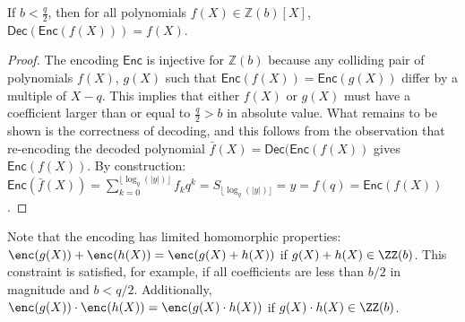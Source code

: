 \begin{lemma}
If $b < \frac{q}{2}$, then for all polynomials $f(X) \in \mathbb{Z}(b)[X]$, $\mathsf{Dec}(\mathsf{Enc}(f(X))) = f(X)$.
\end{lemma}

\begin{proof}
The encoding $\mathsf{Enc}$ is injective for $\mathbb{Z}(b)$ because any colliding pair of polynomials $f(X)$, $g(X)$ such that $\mathsf{Enc}(f(X)) = \mathsf{Enc}(g(X))$ differ by a multiple of $X-q$. This implies that either $f(X)$ or $g(X)$ must have a coefficient larger than or equal to $\frac{q}{2} > b$ in absolute value. What remains to be shown is the correctness of decoding, and this follows from the observation that re-encoding the decoded polynomial $\bar{f}(X) = \mathsf{Dec}(\mathsf{Enc}(f(X))$ gives $\mathsf{Enc}(f(X))$. By construction: $\mathsf{Enc}(\bar{f}(X)) = \sum_{k=0}^{\lfloor \log_q(|y|) \rfloor} f_k q^k = S_{\lfloor \log_q (|y|) \rfloor} = y = f(q) = \mathsf{Enc}(f(X))$.
\end{proof}

Note that the encoding has limited homomorphic properties: $\enc(g(X))+\enc(h(X))=\enc(g(X)+h(X))$ if $g(X)+h(X)\in \ZZ(b)$. This constraint is satisfied, for example, if all coefficients are less than $b/2$ in magnitude and $b < q/2$. Additionally, $\enc(g(X))\cdot \enc(h(X))=\enc(g(X)\cdot h(X))$ if $g(X)\cdot h(X)\in \ZZ(b)$.

